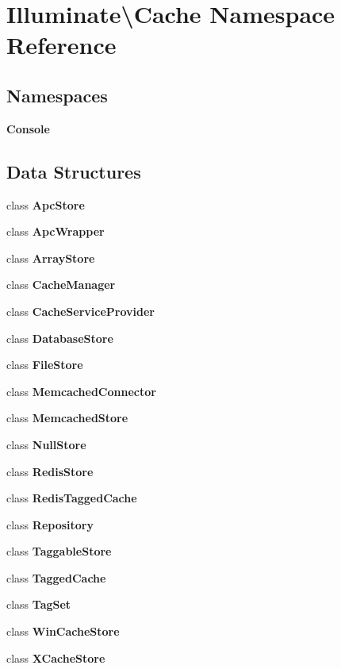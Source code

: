 \section{Illuminate\textbackslash{}Cache Namespace Reference}
\label{namespace_illuminate_1_1_cache}
\subsection*{Namespaces}
\begin{DoxyCompactItemize}
\item 
 {\bf Console}
\end{DoxyCompactItemize}
\subsection*{Data Structures}
\begin{DoxyCompactItemize}
\item 
class {\bf Apc\+Store}
\item 
class {\bf Apc\+Wrapper}
\item 
class {\bf Array\+Store}
\item 
class {\bf Cache\+Manager}
\item 
class {\bf Cache\+Service\+Provider}
\item 
class {\bf Database\+Store}
\item 
class {\bf File\+Store}
\item 
class {\bf Memcached\+Connector}
\item 
class {\bf Memcached\+Store}
\item 
class {\bf Null\+Store}
\item 
class {\bf Redis\+Store}
\item 
class {\bf Redis\+Tagged\+Cache}
\item 
class {\bf Repository}
\item 
class {\bf Taggable\+Store}
\item 
class {\bf Tagged\+Cache}
\item 
class {\bf Tag\+Set}
\item 
class {\bf Win\+Cache\+Store}
\item 
class {\bf X\+Cache\+Store}
\end{DoxyCompactItemize}
